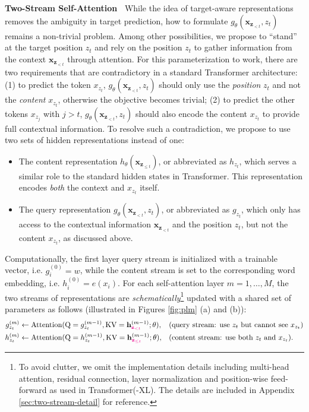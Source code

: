 \documentclass{article}
\newcommand{\magenta}[1]{{\color{magenta}#1}} \usepackage{amsmath,amsfonts,bm}
\def\rvh{{\mathbf{h}}}
\def\rvx{{\mathbf{x}}}
\def\rvz{{\mathbf{z}}}
\begin{document}
\textbf{Two-Stream Self-Attention~}
While the idea of target-aware representations removes the ambiguity in target prediction, how to formulate $g_\theta(\rvx_{\rvz_{<t}}, z_t)$ remains a non-trivial problem.
Among other possibilities, we propose to ``stand'' at the target position $z_t$ and rely on the position $z_t$ to gather information from the context $\rvx_{\rvz_{<t}}$ through attention.
For this parameterization to work, there are two requirements that are contradictory in a standard Transformer architecture: (1) to predict the token $x_{z_t}$, $g_\theta(\mathbf{x}_{\mathbf{z}_{<t}}, z_t)$ should only use the \textit{position} $z_t$ and not the \textit{content} $x_{z_t}$, otherwise the objective becomes trivial; (2) to predict the other tokens $x_{z_{j}}$ with $j > t$, $g_\theta(\mathbf{x}_{\mathbf{z}_{<t}}, z_t)$ should also encode the content $x_{z_t}$ to provide full contextual information.
To resolve such a contradiction, we propose to use two sets of hidden representations instead of one:
\begin{itemize}[leftmargin=*,topsep=0em,itemsep=0em]
\item The content representation $h_\theta(\rvx_{\rvz_{\leq t}})$, or abbreviated as $h_{z_t}$, which serves a similar role to the standard hidden states in Transformer. This representation encodes \textit{both} the context and $x_{z_t}$ itself.
\item The query representation $g_\theta(\rvx_{\rvz_{<t}}, z_t)$, or abbreviated as $g_{z_t}$, which only has access to the contextual information $\rvx_{{\rvz}_{<t}}$ and the position $z_t$, but not the content $x_{z_t}$, as discussed above.
\end{itemize}
Computationally, the first layer query stream is initialized with a trainable vector, i.e. $g_i^{(0)} = w$, while the content stream is set to the corresponding word embedding, i.e. $h_i^{(0)} = e(x_i)$.
For each self-attention layer $m = 1, \dots, M$, the two streams of representations are \textit{schematically}\footnote{To avoid clutter, we omit the implementation details including multi-head attention, residual connection, layer normalization and position-wise feed-forward as used in Transformer(-XL). The details are included in Appendix \ref{sec:two-stream-detail} for reference.} updated with a shared set of parameters as follows (illustrated in Figures \ref{fig:plm} (a) and (b)):
\begin{align*}
\small
	g_{z_t}^{(m)} &\leftarrow \text{Attention}(
		\text{Q} = g_{z_t}^{(m-1)}, \text{KV}= \rvh_{\magenta{\rvz_{<t}}}^{(m-1)}; \theta),
	&& (\text{query stream: use $z_t$ but cannot see $x_{z_t}$}) \\
	h_{z_t}^{(m)} &\leftarrow \text{Attention}(
		\text{Q} = h_{z_t}^{(m-1)}, \text{KV}= \rvh_{\magenta{\rvz_{\leq t}}}^{(m-1)}; \theta), 
	&& (\text{content stream: use both $z_t$ and $x_{z_t}$}).
\end{align*}
\end{document}
